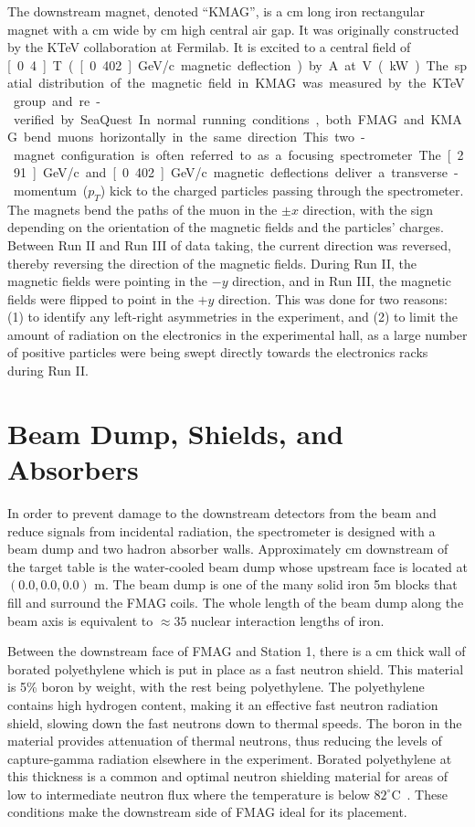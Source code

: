 The downstream magnet, denoted ``KMAG'', is a \unit[300]{cm} long iron rectangular magnet with a \unit[289]{cm} wide by \unit[203]{cm} high central air gap.  It was originally constructed by the KTeV collaboration\cite{PhysRevD.67.012005} at Fermilab.  It is excited to a central field of \unit[0.4]{T} (\unit[0.402]{GeV/c} magnetic deflection) by \unit[1600]{A} at \unit[270]{V} (\unit[430]{kW}).  The spatial distribution of the magnetic field in KMAG was measured by the KTeV group and re-verified by SeaQuest.  In normal running conditions, both FMAG and KMAG bend muons horizontally in the same direction. This two-magnet configuration is often referred to as a focusing spectrometer.

The \unit[2.91]{GeV/c} and \unit[0.402]{GeV/c} magnetic deflections deliver a transverse-momentum ($p_T$) kick to the charged particles passing through the spectrometer. The magnets bend the paths of the muon in the $\pm x$ direction, with the sign depending on the orientation of the magnetic fields and the particles' charges. Between Run II and Run III of data taking, the current direction was reversed, thereby reversing the direction of the magnetic fields. During Run II, the magnetic fields were pointing in the $-y$ direction, and in Run III, the magnetic fields were flipped to point in the $+y$ direction. This was done for two reasons: (1) to identify any left-right asymmetries in the experiment, and (2) to limit the amount of radiation on the electronics in the experimental hall, as a large number of positive particles were being swept directly towards the electronics racks during Run II.

\section{Beam Dump, Shields, and Absorbers}

In order to prevent damage to the downstream detectors from the beam and reduce signals from incidental radiation, the spectrometer is designed with a beam dump and two hadron absorber walls. Approximately \unit[125]{cm} downstream of the target table is the water-cooled beam dump whose upstream face is located at $(0.0, 0.0, 0.0)$ m. The beam dump is one of the many solid iron 5m blocks that fill and surround the FMAG coils. The whole length of the beam dump along the beam axis is equivalent to $\approx 35$ nuclear interaction lengths of iron. 

Between the downstream face of FMAG and Station 1, there is a \unit[2]{cm} thick wall of borated polyethylene which is put in place as a fast neutron shield. This material is 5\% boron by weight, with the rest being polyethylene. The polyethylene contains high hydrogen content, making it an effective fast neutron radiation shield, slowing down the fast neutrons down to thermal speeds. The boron in the material provides attenuation of thermal neutrons, thus reducing the levels of capture-gamma radiation elsewhere in the experiment. Borated polyethylene at this thickness is a common and optimal neutron shielding material for areas of low to intermediate neutron flux where the temperature is below $82^\circ$C~\cite{borated:1}. These conditions make the downstream side of FMAG ideal for its placement.

